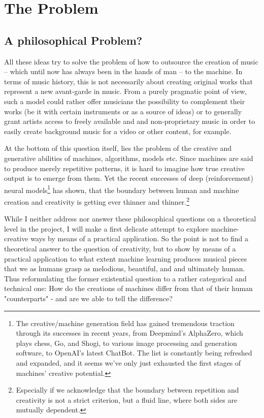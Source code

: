 \documentclass[a4paper, 10pt, xcolor=dvipsnames]{article} %
\begin{document}
\section{The Problem}
\subsection{A philosophical Problem?}

All these ideas try to solve the problem of how to outsource the creation of
music -- which until now has always been in the hands of man -- to the machine.
In terms of music history, this is not necessarily about creating original
works that represent a new avant-garde in music. From a purely pragmatic point
of view, such a model could rather offer musicians the possibility to
complement their works (be it with certain instruments or as a source of ideas)
or to generally grant artists access to freely available and and
non-proprietary music in order to easily create background music for a video or
other content, for example.

At the bottom of this question itself, lies the problem of the creative and
generative abilities of machines, algorithms, models etc. Since machines are
said to produce merely repetitive patterns, it is hard to imagine how true
creative output is to emerge from them. Yet the recent successes of deep
(reinforcement) neural models\footnote{The creative/machine generation field
  has gained tremendous traction through its successes in recent years, from
  Deepmind's AlphaZero, which plays chess, Go, and Shogi, to various image
  processing and generation software, to OpenAI's latest ChatBot. The list is
  constantly being refreshed and expanded, and it seems we've only just exhausted
  the first stages of machines' creative potential.} has shown, that the boundary
between human and machine creation and creativity is getting ever thinner and
thinner.\footnote{Especially if we acknowledge that the boundary between
  repetition and creativity is not a strict criterion, but a fluid line, where
  both sides are mutually dependent.}

While I neither address nor answer these philosophical questions on a
theoretical level in the project, I will make a first delicate attempt to
explore machine-creative ways by means of a practical application. So the point
is not to find a theoretical answer to the question of creativity, but to show
by means of a practical application to what extent machine learning produces
musical pieces that we as humans grasp as melodious, beautiful, and and
ultimately human. Thus reformulating the former existential question to a
rather categorical and technical one: How do the creations of machines differ
from that of their human "counterparts" - and are we able to tell the
difference?
\end{document}
